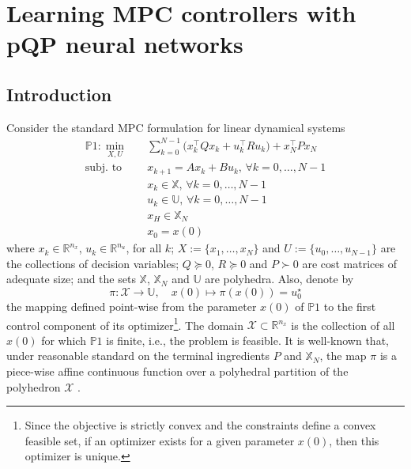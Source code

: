 \cleardoublepage
\chapter{Learning MPC controllers with pQP neural networks}

\section{Introduction}

Consider the standard MPC formulation for linear dynamical systems
\begin{subequations}
	\label{eq:linearmpc}
	\begin{align}
		\mathds{P}1: \min_{X,U} \quad & \sum_{k=0}^{N-1} \big( x_k^\top Q x_k + u_k^\top R u_k \big) + x_N^\top P x_N\\
		\text{subj. to} \quad 
		& x_{k+1} = A x_{k} + B u_{k}, \, \forall k = 0,\dots,N-1  \\
		& x_{k} \in \mathbb{X}, \, \forall k = 0,\dots,N-1 \\
		& u_{k} \in \mathbb{U}, \, \forall k = 0,\dots,N-1 \\
		& x_{H} \in \mathbb{X}_N \\
		& x_0 = x(0)
	\end{align}
\end{subequations}
where $x_k \in \mathbb{R}^{n_x}$, $u_k \in \mathbb{R}^{n_u}$, for all $k$; $X:=\{x_1,\dots,x_{N}\}$ and $U:=\{u_0,\dots,u_{N-1}\}$ are the collections of decision variables; $Q \succeq 0$, $R \succeq 0$ and $P \succ 0$ are cost matrices of adequate size; and the sets $\mathbb{X}$, $\mathbb{X}_N$ and $\mathbb{U}$ are polyhedra. Also, denote by 
\begin{equation}
	\pi: \mathcal{X} \rightarrow \mathbb{U}, \quad x(0) \mapsto \pi(x(0)) = u_0^\star
\end{equation} 
the mapping defined point-wise from the parameter $x(0)$ of $\mathds{P}1$ to the first control component of its optimizer\footnote{Since the objective is strictly convex and the constraints define a convex feasible set, if an optimizer exists for a given parameter $x(0)$, then this optimizer is unique.}. The domain $\mathcal{X} \subset \mathbb{R}^{n_x}$ is the collection of all $x(0)$ for which $\mathds{P}1$ is finite, i.e., the problem is feasible. It is well-known that, under reasonable standard on the terminal ingredients $P$ and $\mathbb{X}_N$, the map $\pi$ is a piece-wise affine continuous function over a polyhedral partition of the polyhedron $\mathcal{X}$ \citep{bemporad2002explicit,borrelli2017predictive}. 

